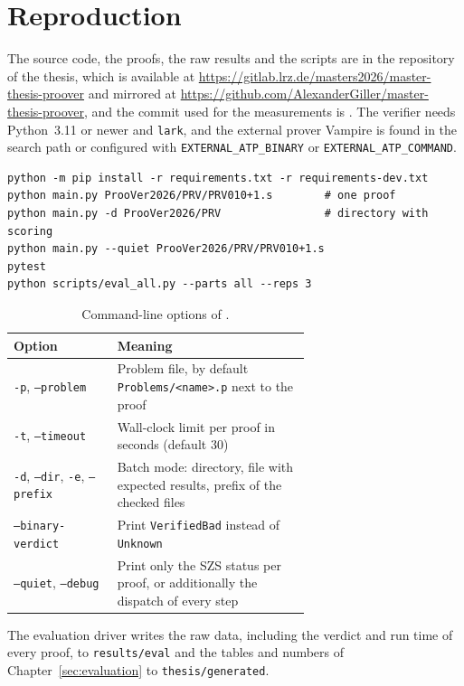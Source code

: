 
\section{Reproduction}
\label{app:reproduction}

The source code, the proofs, the raw results and the scripts are in the repository of the thesis, which is available at \url{https://gitlab.lrz.de/masters2026/master-thesis-proover} and mirrored at \url{https://github.com/AlexanderGiller/master-thesis-proover}, and the commit used for the measurements is \EvalCommit.
The verifier needs Python~3.11 or newer and \texttt{lark}, and the external prover Vampire is found in the search path or configured with \texttt{EXTERNAL\_ATP\_BINARY} or \texttt{EXTERNAL\_ATP\_COMMAND}.

\begin{verbatim}
python -m pip install -r requirements.txt -r requirements-dev.txt
python main.py ProoVer2026/PRV/PRV010+1.s        # one proof
python main.py -d ProoVer2026/PRV                # directory with scoring
python main.py --quiet ProoVer2026/PRV/PRV010+1.s
pytest
python scripts/eval_all.py --parts all --reps 3
\end{verbatim}

\begin{table}[htb]
\centering
\small
\caption{Command-line options of \TSTPy{}.}
\label{tab:app-cli}
\begin{tabular}{@{}l P{0.65\linewidth}@{}}
\toprule
Option & Meaning \\
\midrule
\texttt{-p}, \texttt{--problem} & Problem file, by default \texttt{Problems/<name>.p} next to the proof \\
\texttt{-t}, \texttt{--timeout} & Wall-clock limit per proof in seconds (default 30) \\
\texttt{-d}, \texttt{--dir}, \texttt{-e}, \texttt{--prefix} & Batch mode: directory, file with expected results, prefix of the checked files \\
\texttt{--binary-verdict} & Print \texttt{VerifiedBad} instead of \texttt{Unknown} \\
\texttt{--quiet}, \texttt{--debug} & Print only the SZS status per proof, or additionally the dispatch of every step \\
\bottomrule
\end{tabular}
\end{table}

The evaluation driver writes the raw data, including the verdict and run time of every proof, to \texttt{results/eval} and the tables and numbers of Chapter~\ref{sec:evaluation} to \texttt{thesis/generated}.

